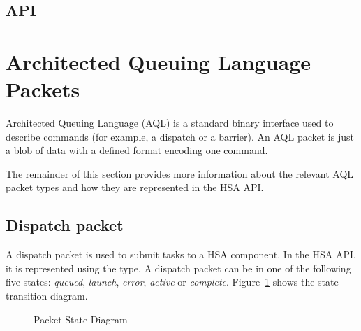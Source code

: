 \documentclass[final]{book}
\begin{document}
\subsection{API}


\section{Architected Queuing Language Packets}\label{sec:aql}
Architected Queuing Language (AQL) is a standard binary interface used to
describe commands (for example, a dispatch or a barrier). An AQL packet is just
a blob of data with a defined format encoding one command.

The remainder of this section provides more information about the relevant AQL
packet types and how they are represented in the HSA API.

\subsection{Dispatch packet}\label{dispatch-packet}

A dispatch packet is used to submit tasks to a HSA component. In the HSA API, it
is represented using the  type. A dispatch
packet can be in one of the following five states: \emph{queued},
\emph{launch}, \emph{error}, \emph{active} or
\emph{complete}. Figure~\ref{fig:packetstate} shows the state transition
diagram.

\begin{figure}[b]
  \centering
  \scriptsize
{}
  \centering
  \caption{Packet State Diagram}
  \label{fig:packetstate}
\end{figure}
\end{document}

